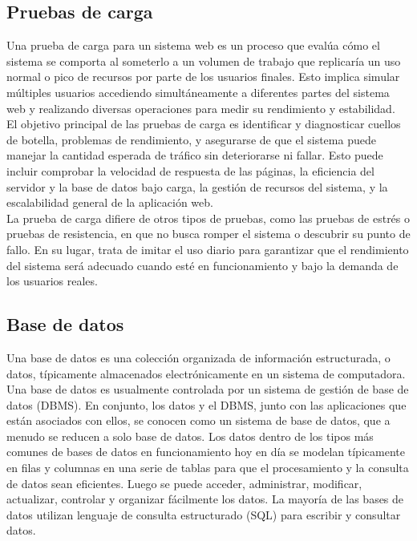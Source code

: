 \documentclass[10pt]{article}
\begin{document}
\subsection{Pruebas de carga}
\justify
Una prueba de carga para un sistema web es un proceso que evalúa cómo el sistema se comporta al someterlo a un volumen de trabajo que replicaría un uso normal o pico de recursos por parte de los usuarios finales. Esto implica simular múltiples usuarios accediendo simultáneamente a diferentes partes del sistema web y realizando diversas operaciones para medir su rendimiento y estabilidad.\\
El objetivo principal de las pruebas de carga es identificar y diagnosticar cuellos de botella, problemas de rendimiento, y asegurarse de que el sistema puede manejar la cantidad esperada de tráfico sin deteriorarse ni fallar. Esto puede incluir comprobar la velocidad de respuesta de las páginas, la eficiencia del servidor y la base de datos bajo carga, la gestión de recursos del sistema, y la escalabilidad general de la aplicación web.\\
La prueba de carga difiere de otros tipos de pruebas, como las pruebas de estrés o pruebas de resistencia, en que no busca romper el sistema o descubrir su punto de fallo. En su lugar, trata de imitar el uso diario para garantizar que el rendimiento del sistema será adecuado cuando esté en funcionamiento y bajo la demanda de los usuarios reales.

\subsection{Base de datos}
\justify
Una base de datos es una colección organizada de información estructurada, o datos, típicamente almacenados electrónicamente en un sistema de computadora. Una base de datos es usualmente controlada por un sistema de gestión de base de datos (DBMS). En conjunto, los datos y el DBMS, junto con las aplicaciones que están asociados con ellos, se conocen como un sistema de base de datos, que a menudo se reducen a solo base de datos.
Los datos dentro de los tipos más comunes de bases de datos en funcionamiento hoy en día se modelan típicamente en filas y columnas en una serie de tablas para que el procesamiento y la consulta de datos sean eficientes. Luego se puede acceder, administrar, modificar, actualizar, controlar y organizar fácilmente los datos. La mayoría de las bases de datos utilizan lenguaje de consulta estructurado (SQL) para escribir y consultar datos. \par\vspace{\baselineskip}
\end{document}
